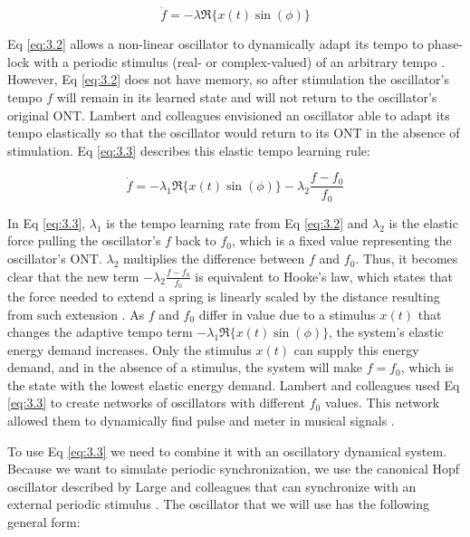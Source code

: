 \documentclass{report}
\begin{document}
\begin{equation}
\dot{f} = -\lambda \Re \{ x(t) \sin(\phi) \} \label{eq:3.2}
\end{equation}

Eq \eqref{eq:3.2} allows a non-linear oscillator to dynamically adapt its tempo to phase-lock with a periodic stimulus (real- or complex-valued) of an arbitrary tempo \cite{righetti2006dynamic}. However, Eq \eqref{eq:3.2} does not have memory, so after stimulation the oscillator's tempo $f$ will remain in its learned state and will not return to the oscillator's original ONT. Lambert and colleagues \cite{lambert2016adaptive} envisioned an oscillator able to adapt its tempo elastically so that the oscillator would return to its ONT in the absence of stimulation. Eq \eqref{eq:3.3} describes this elastic tempo learning rule:

\begin{equation}
\dot{f} = -\lambda_1 \Re \{ x(t) \sin(\phi) \} - \lambda_2 \frac{f-f_0}{f_0} \label{eq:3.3}
\end{equation}

In Eq \eqref{eq:3.3}, $\lambda_1$ is the tempo learning rate from Eq \eqref{eq:3.2} and $\lambda_2$ is the elastic force pulling the oscillator's $f$ back to $f_0$, which is a fixed value representing the oscillator's ONT. $\lambda_2$ multiplies the difference between $f$ and $f_0$. Thus, it becomes clear that the new term $−\lambda_2 \frac{f-f_0}{f_0}$ is equivalent to Hooke's law, which states that the force needed to extend a spring is linearly scaled by the distance resulting from such extension \cite{lambert2016adaptive}. As $f$ and $f_0$ differ in value due to a stimulus $x(t)$ that changes the adaptive tempo term $-\lambda_1 \Re \{ x(t) \sin(\phi) \}$, the system's elastic energy demand increases. Only the stimulus $x(t)$ can supply this energy demand, and in the absence of a stimulus, the system will make $f = f_0$, which is the state with the lowest elastic energy demand. Lambert and colleagues \cite{lambert2016adaptive} used Eq \eqref{eq:3.3} to create networks of oscillators with different $f_0$ values. This network allowed them to dynamically find pulse and meter in musical signals \cite{lambert2016adaptive}.

To use Eq \eqref{eq:3.3} we need to combine it with an oscillatory dynamical system. Because we want to simulate periodic synchronization, we use the canonical Hopf oscillator described by Large and colleagues that can synchronize with an external periodic stimulus \cite{large2010canonical, kim2015signal}. The oscillator that we will use has the following general form:
\end{document}

